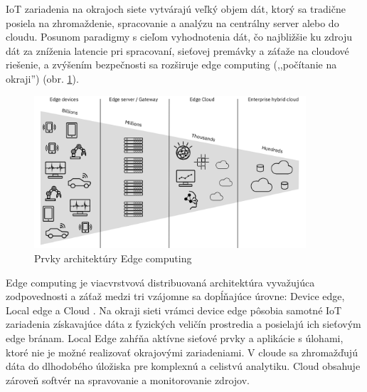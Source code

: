 IoT zariadenia na okrajoch siete vytvárajú veľký objem dát, ktorý sa tradične posiela na zhromaždenie, spracovanie
a analýzu na centrálny server alebo do cloudu. Posunom paradigmy s cieľom vyhodnotenia dát, čo najbližšie
ku zdroju dát za zníženia latencie pri spracovaní, sieťovej premávky a záťaže na cloudové riešenie, a zvýšením
bezpečnosti sa rozširuje edge computing (,,počítanie na okraji'') (obr. \ref{fig:edge-computing}).
\begin{figure}[h]
	\centering
	\includegraphics[width=0.9\textwidth]{figures/analysis/edge-computing.png}
	\caption{Prvky architektúry Edge computing \cite{ibm-edge-architecture}}
	\label{fig:edge-computing}
\end{figure}

Edge computing je viacvrstvová distribuovaná architektúra vyvažujúca zodpovednosti a záťaž medzi
tri vzájomne sa dopĺňajúce úrovne: Device edge, Local edge a Cloud \cite{edge-computing-survey}. Na okraji sieti
vrámci device edge pôsobia  samotné IoT zariadenia získavajúce dáta z fyzických veličín prostredia a posielajú ich
sieťovým edge bránam. Local Edge zahŕňa aktívne sieťové prvky a aplikácie s úlohami, ktoré nie je možné realizovať
okrajovými zariadeniami. V cloude sa zhromažďujú dáta do dlhodobého úložiska pre komplexnú a celistvú analytiku.
Cloud obsahuje zároveň softvér na spravovanie a monitorovanie zdrojov.
